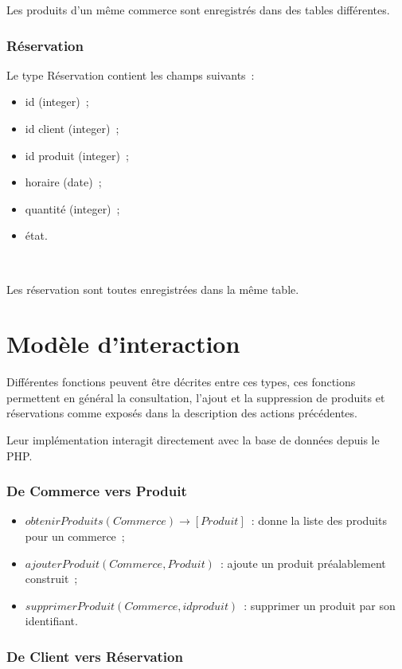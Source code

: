 \documentclass[a4paper,12pt]{article}
\begin{document}
Les produits d'un même commerce sont enregistrés dans des tables différentes.

\subsubsection{Réservation}

Le type Réservation contient les champs suivants~:
\begin{itemize}
	\item id (integer)~;
	\item id client (integer)~;
	\item id produit (integer)~;
	\item horaire (date)~;
	\item quantité (integer)~;
	\item état.
\end{itemize} \

Les réservation sont toutes enregistrées dans la même table.

\section{Modèle d'interaction}

Différentes fonctions peuvent être décrites entre ces types, ces fonctions permettent en général la consultation, l'ajout et la suppression de produits et réservations comme exposés dans la description des actions précédentes.

Leur implémentation interagit directement avec la base de données depuis le PHP.

\subsubsection{De Commerce vers Produit}

\begin{itemize}
	\item $obtenirProduits(Commerce) \rightarrow [Produit]$~: donne la liste des produits pour un commerce~;
	\item $ajouterProduit(Commerce, Produit)$~: ajoute un produit préalablement construit~;
	\item $supprimerProduit(Commerce, idproduit)$~: supprimer un produit par son identifiant.
\end{itemize}

\subsubsection{De Client vers Réservation}
\end{document}
